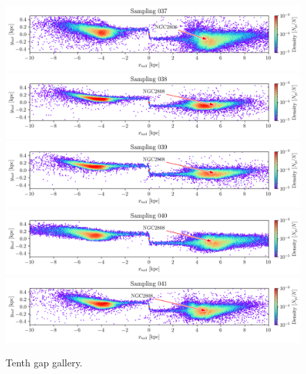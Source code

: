 \documentclass[draft]{aa}
\begin{document}
\begin{appendix}
    \begin{figure}
      \centering
      \includegraphics[width=\linewidth]{gallery_of_gaps_monte-carlo-037.png}
      \includegraphics[width=\linewidth]{gallery_of_gaps_monte-carlo-038.png}
      \includegraphics[width=\linewidth]{gallery_of_gaps_monte-carlo-039.png}
      \includegraphics[width=\linewidth]{gallery_of_gaps_monte-carlo-040.png}
      \includegraphics[width=\linewidth]{gallery_of_gaps_monte-carlo-041.png}      
      \caption{Tenth gap gallery.}
      \label{fig:gallery9}
    \end{figure}        
    

\end{appendix}
\end{document}
